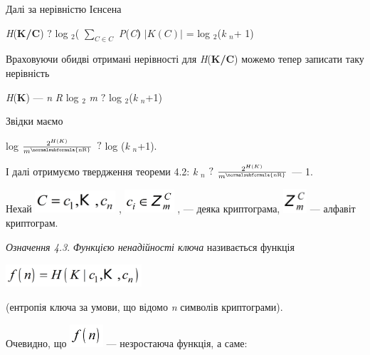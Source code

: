 Далі за нерівністю Ієнсена

{\centering
\textit{H}(\textbf{K}\textbf{/}\textbf{C})   ${?}$ log ${{}_{{2}}}$(
${\underset{{C\in C}}{\sum }{}}$ \textit{P}(\textit{C}\textbf{) } ${|K(C)|}$ = 
log ${{}_{{2}}}$(\textit{k} ${{}_{{n}}}$+ 1) $ $
\par}

Враховуючи обидві отримані нерівності для 
\textit{H}(\textbf{K}\textbf{/}\textbf{C}) можемо тепер записати таку
нерівність 

{\centering
\textit{H}(\textbf{K}) --- \textit{n}\textit{ }\textit{R} log ${{}_{{2}}}$
\textit{m}   ${?}$  log ${{}_{{2}}}$(\textit{k} ${{}_{{n}}}$+1)
\par}

Звідки  маємо

{\centering
log  ${\frac{2^{H(K)}}{m^{\normalsubformula{\text{nR}}}}}$   ${?}$  log
(\textit{k} ${{}_{{n}}}$+1).
\par}

І  далі отримуємо твердження теореми 4.2:  \textit{k} ${{}_{{n}}}$   ${?}$  
${\frac{2^{{H(K)}}}{m^{{\normalsubformula{\text{nR}}}}}}$  --- 1. 

Нехай 
\includegraphics[width=1.1764in,height=0.3327in]{crypt-img/crypt-img38.png} ,  
\includegraphics[width=0.7201in,height=0.3472in]{crypt-img/crypt-img39.png} , ---
деяка криптограма, 
\includegraphics[width=0.3465in,height=0.3465in]{crypt-img/crypt-img40.png}  ---
алфавіт криптограм.

\textit{Означення 4.3}. \textit{Функцією ненадійності ключа} називається 
функція 

{\centering 
\includegraphics[width=1.9882in,height=0.3346in]{crypt-img/crypt-img41.png}
\par}

(ентропія ключа за умови, що відомо \textit{n }символів криптограми).

Очевидно, що 
\includegraphics[width=0.4874in,height=0.3354in]{crypt-img/crypt-img42.png}  ---
незростаюча функція, а саме:

